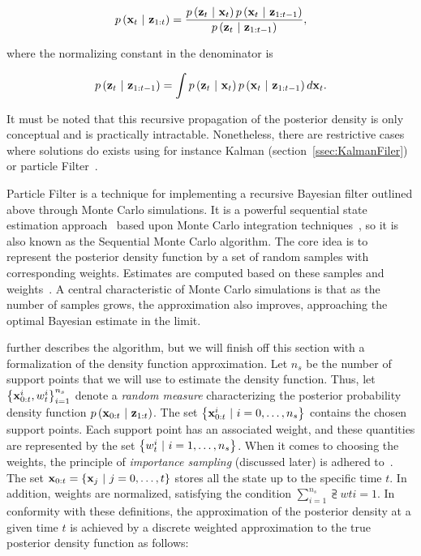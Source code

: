\begin{equation}
    p \left( \mathbf{x}_t \ | \ \mathbf{z}_{1:t} \right) =
    \frac{
        p \left( \mathbf{z}_t \ | \ \mathbf{x}_{t} \right)
        p \left( \mathbf{x}_t \ | \ \mathbf{z}_{1:t - 1} \right)
    }{
        p \left( \mathbf{z}_t \ | \ \mathbf{z}_{1:t - 1} \right)
    },
\end{equation}

\noindent where the normalizing constant in the denominator is

\begin{equation}
    p \left( \mathbf{z}_t \ | \ \mathbf{z}_{1:t - 1} \right) =
    \int
    p \left( \mathbf{z}_t \ | \ \mathbf{x}_{t} \right)
    p \left( \mathbf{x}_t \ | \ \mathbf{z}_{1:t - 1} \right)
    d\mathbf{x}_t.
\end{equation}

\noindent It must be noted that this recursive propagation of the posterior density is only conceptual and is practically intractable. Nonetheless, there are restrictive cases where solutions do exists using for instance Kalman (section~\ref{ssec:KalmanFiler}) or particle Filter~\cite{Arulampalam2007}.

Particle Filter is a technique for implementing a recursive Bayesian filter outlined above through Monte Carlo simulations.  It is a powerful sequential state estimation approach~\cite{doucet2001introduction} based upon Monte Carlo integration techniques~\cite{mihaylova2007object}, so it is also known as the Sequential Monte Carlo algorithm. The core idea is to represent the posterior density function by a set of random samples with corresponding weights. Estimates are computed based on these samples and weights~\cite{Arulampalam2007}. A central characteristic of Monte Carlo simulations is that as the number of samples grows, the approximation also improves, approaching the optimal Bayesian estimate in the limit.

\cite{Arulampalam2007} further describes the algorithm, but we will finish off this section with a formalization of the density function approximation. Let $n_s$ be the number of support points that we will use to estimate the density function. Thus, let ${\left\{ {{\mathbf{x}}_{0:t}^{i}, {w}_{t}^{i}} \right\}}_{i = 1}^{n_s}$ denote a \emph{random measure} characterizing the posterior probability density function $p \left( \mathbf{x}_{0:t} \ | \ \mathbf{z}_{1:t} \right)$. The set $\left\{ {{\mathbf{x}}_{0:t}^{i} \ | \ i = 0, \dots, n_s} \right\}$ contains the chosen support points. Each support point has an associated weight, and these quantities are represented by the set $\left\{ {{w}_{t}^{i} \ | \ i = 1, \dots, n_s} \right\}$. When it comes to choosing the weights, the principle of \emph{importance sampling} (discussed later) is adhered to~\cite{bergman1999recursive, stordal2008sequential}. The set $\vect{x}_{0:t} = \cbrackets{\vect{x}_j \ | \ j = 0, \dots, t}$ stores all the state up to the specific time $t$. In addition, weights are normalized, satisfying the condition $\sum_{i = 1}^{n_s} \supsub{w}{t}{i} = 1$. In conformity with these definitions, the approximation of the posterior density at a given time $t$ is achieved by a discrete weighted approximation to the true posterior density function as follows:

